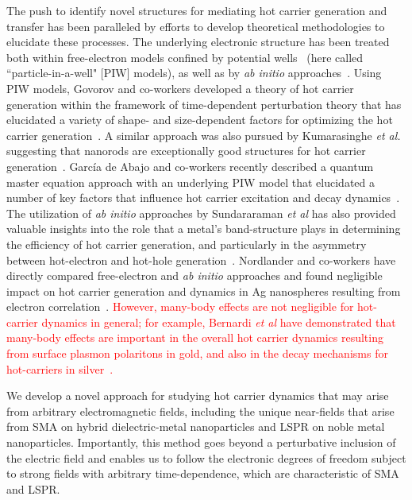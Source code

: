 \documentclass[journal=jpclcd,manuscript=article]{achemso}
\begin{document}
The push to identify novel structures for mediating hot carrier generation and transfer has been paralleled by 
efforts to develop theoretical methodologies to elucidate these processes.  The underlying electronic
structure has been treated both within free-electron models confined by potential wells~\cite{GZG_JPCC_2013,ZG_JPCC_2014,MLK_ACSNano_2014,KPB_SciRep_2015,SAG_ACSPhotonics_2016} (here called
``particle-in-a-well" [PIW] models), as well as by {\it ab initio} approaches~\cite{SNJ_NatComm_2014,BMN_NatComm_2015,MWW_NatComm_2015,BSN_ACSNano_2016}.
Using PIW models, Govorov and co-workers developed a theory of 
hot carrier generation within the framework of time-dependent perturbation theory that
has elucidated a variety of shape- and size-dependent factors for optimizing 
the hot carrier generation~\cite{GZG_JPCC_2013,ZG_JPCC_2014}.  A similar approach was also pursued by Kumarasinghe {\it et al.} suggesting
that nanorods are exceptionally good structures for hot carrier generation~\cite{KPB_SciRep_2015}.  Garc\'ia de Abajo and co-workers recently described a 
quantum master equation approach with an underlying PIW model that elucidated a number of key factors that influence
hot carrier excitation and decay dynamics~\cite{SAG_ACSPhotonics_2016}.  The utilization of {\it ab initio} approaches by Sundararaman {\it et al} 
has also provided valuable insights into the role that a metal's band-structure plays
in determining the efficiency of hot carrier generation, and particularly in the asymmetry between hot-electron
and hot-hole generation~\cite{SNJ_NatComm_2014}.  Nordlander and co-workers have directly compared free-electron and {\it ab initio} approaches
and found negligible impact on hot carrier generation and dynamics in Ag nanospheres resulting from electron correlation~\cite{MLK_ACSNano_2014}.  \textcolor{red}{However, many-body effects are not negligible for hot-carrier dynamics
in general; for example, Bernardi {\it et al} have demonstrated that many-body effects are important 
in the overall hot carrier dynamics resulting
from surface plasmon polaritons in gold, and also in the decay mechanisms for hot-carriers in silver~\cite{BMN_NatComm_2015}.}

We develop a novel approach for studying hot carrier dynamics that may arise from arbitrary electromagnetic
fields, including the unique near-fields that arise from SMA on hybrid dielectric-metal nanoparticles and LSPR
on noble metal nanoparticles.  Importantly, this method goes beyond a perturbative inclusion of the electric field and enables us to follow the electronic degrees of freedom subject to strong fields with arbitrary time-dependence, which are characteristic of SMA and LSPR.   
\end{document}

